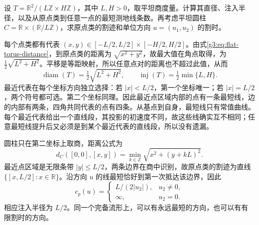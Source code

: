 \begin{exercise}\label{g3:ex:rectangular-torus-distance}
	设 \(T=\mathbb R^2/(L\mathbb Z\times H\mathbb Z)\)，其中 \(L,H>0\)，取平坦商度量。计算其直径、注入半径，以及从原点类到任意一点的最短测地线条数。再考虑平坦圆柱 \(C=\mathbb R\times(\mathbb R/L\mathbb Z)\)，求原点类的割迹和单位方向 \(u=(u_1,u_2)\) 的割时。
\end{exercise}
\begin{solution}
	每个点类都有代表 \((x,y)\in[-L/2,L/2]\times[-H/2,H/2]\)。由式\eqref{g3:eq:flat-torus-distance}，到原点类的距离为 \(\sqrt{x^2+y^2}\)，故最大值在角点取得，为 \(\tfrac12\sqrt{L^2+H^2}\)。平移是等距映射，所以任意点对的距离也不超过此值，从而
	\[
		\operatorname{diam}(T)=\tfrac12\sqrt{L^2+H^2},\qquad
		\operatorname{inj}(T)=\tfrac12\min\{L,H\}.
	\]
	最近代表在每个坐标方向独立选择：若 \(|x|<L/2\)，第一个坐标唯一；若 \(|x|=L/2\)，两个符号都可选。第二个坐标同理。因此最近点区域内部的点有一条最短线，边的内部有两条，四角共同代表的点有四条。从基点到自身，最短线只有常值曲线。每个最近代表给出一个直线段，其投影的初速度不同，故这些线确实互不相同；任意最短线提升后又必须是到某个最近代表的直线段，所以没有遗漏。

	圆柱只在第二坐标上取商，距离公式为
	\[
		d_C([0,0],[x,y])=\min_{k\in\mathbb Z}\sqrt{x^2+(y+kL)^2}.
	\]
	最近点区域是无限条带 \(|y|\le L/2\)，两条边界在商中识别，故原点类的割迹为直线 \(\{[x,L/2]:x\in\mathbb R\}\)。沿方向 \(u\) 的线最短恰好到第一次抵达该边界，因此
	\[
		c_p(u)=
		\begin{cases}
			L/(2|u_2|),&u_2\ne0,\\
			\infty,&u_2=0.
		\end{cases}
	\]
	相应注入半径为 \(L/2\)。同一个完备流形上，可以有永远最短的方向，也可以有有限割时的方向。
\end{solution}

